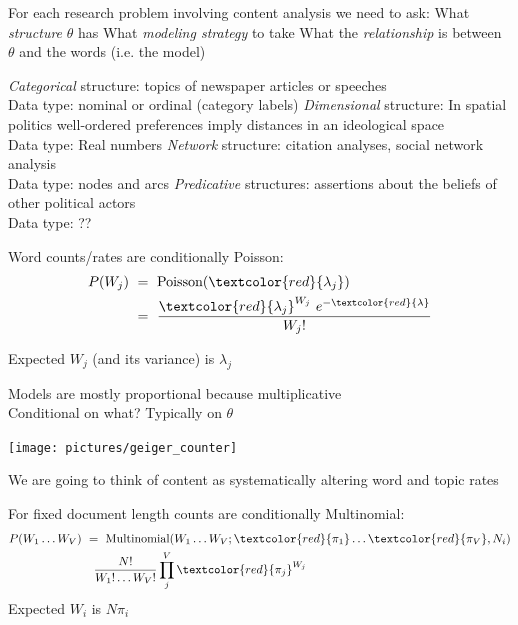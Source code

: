 \documentclass{mediumfoils}
\begin{document}
For each research problem involving content analysis we need to ask:
\ita
\itm What \textit{structure} $\theta$ has
\itm What \textit{modeling strategy} to take
\itm What the \textit{relationship} is between $\theta$ and the words (i.e. the model)
\itz

 
\ita
\itm \textsl{Categorical} structure: topics of newspaper articles or speeches\\Data type: nominal or ordinal (category labels)
\itm \textsl{Dimensional} structure: In spatial politics well-ordered preferences imply distances in an ideological space\\Data type: Real numbers
\itm \textsl{Network} structure: citation analyses, social network analysis\\Data type: nodes and arcs
\itm \textsl{Predicative} structures: assertions about the beliefs of other political actors\\Data type: ??
\itz

 
Word counts/rates are conditionally Poisson:
\begin{align*}
P(W_j) &~=~ \text{Poisson}(\textcolor{red}{\lambda_{j}})\\
         &~=~ \frac{\textcolor{red}{\lambda_{j}}^{W_{j}}~e^{-\textcolor{red}{\lambda}}}{W_{j}!}
\end{align*}

Expected $W_{j}$ (and its variance) is $\lambda_{j}$

Models are mostly proportional because multiplicative
~\\
Conditional on what?  Typically on $\theta$


\centerline{\texttt{[image: pictures/geiger\_counter]}}


We are going to think of content as systematically altering word and topic rates


For fixed document length counts are conditionally Multinomial:
\begin{align*}
P(W_{1}\ldots W_{V}) &~=~ \text{Multinomial}(W_{1}\ldots W_{V}; \textcolor{red}{\pi_{1}}\ldots\textcolor{red}{\pi_{V}}, N_i)\\
                     &~~~\frac{N!}{W_{1}!\ldots W_{V}!} \prod^{V}_{j} \textcolor{red}{\pi_{j}}^{W_{j}}
\end{align*}
Expected $W_{i}$ is $N\pi_{i}$
\end{document}
